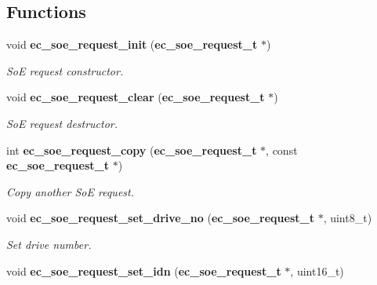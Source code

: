 \subsection*{\-Functions}
\begin{DoxyCompactItemize}
\item 
void {\bf ec\-\_\-soe\-\_\-request\-\_\-init} ({\bf ec\-\_\-soe\-\_\-request\-\_\-t} $\ast$)\label{soe__request_8h_a153a97cf0b6f06a25566bced679a548f}

\begin{DoxyCompactList}\small\item\em \-So\-E request constructor. \end{DoxyCompactList}\item 
void {\bf ec\-\_\-soe\-\_\-request\-\_\-clear} ({\bf ec\-\_\-soe\-\_\-request\-\_\-t} $\ast$)\label{soe__request_8h_a62db42f000afec347cb9abeef113e06c}

\begin{DoxyCompactList}\small\item\em \-So\-E request destructor. \end{DoxyCompactList}\item 
int {\bf ec\-\_\-soe\-\_\-request\-\_\-copy} ({\bf ec\-\_\-soe\-\_\-request\-\_\-t} $\ast$, const {\bf ec\-\_\-soe\-\_\-request\-\_\-t} $\ast$)
\begin{DoxyCompactList}\small\item\em \-Copy another \-So\-E request. \end{DoxyCompactList}\item 
void {\bf ec\-\_\-soe\-\_\-request\-\_\-set\-\_\-drive\-\_\-no} ({\bf ec\-\_\-soe\-\_\-request\-\_\-t} $\ast$, uint8\-\_\-t)\label{soe__request_8h_a31de21e8095a24e03eb4a5e5662f7d66}

\begin{DoxyCompactList}\small\item\em \-Set drive number. \end{DoxyCompactList}\item 
void {\bf ec\-\_\-soe\-\_\-request\-\_\-set\-\_\-idn} ({\bf ec\-\_\-soe\-\_\-request\-\_\-t} $\ast$, uint16\-\_\-t)\label{soe__request_8h_a4779a40d4914431cfe445423ae85ff31}


\end{DoxyCompactItemize}
